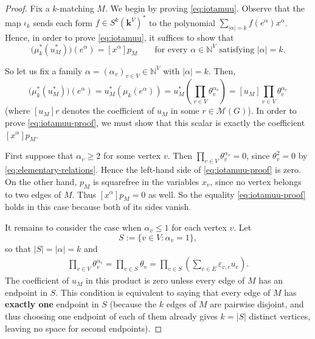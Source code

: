\documentclass[12pt]{amsart}
\theoremstyle{definition}
\theoremstyle{remark}
\newcommand{\kk}{\mathbf{k}}
\begin{document}
\begin{proof}
Fix a $k$-matching $M$.  We begin by proving \eqref{eq:iotamuu}.
Observe that the map $\iota_k$ sends each form $f \in S^k(\kk^V)^*$
to the polynomial $\sum_{|\alpha| = k} f(e^\alpha) x^\alpha$.
Hence, in order to prove \eqref{eq:iotamuu}, it suffices to show
that
\begin{equation}\label{eq:iotamuu-proof}
 \bigl(\mu_k^*(u_M^*)\bigr)(e^\alpha)=[x^\alpha]p_M
 \qquad\text{for every }\alpha \in \mathbb{N}^V
 \text{ satisfying }|\alpha| = k.
\end{equation}

So let us fix a family
$\alpha=(\alpha_v)_{v\in V}\in\mathbb{N}^V$ with
$|\alpha|=k$. Then,
\[
 \bigl(\mu_k^*(u_M^*)\bigr)(e^\alpha)
 = u_M^* \left( \mu_k(e^\alpha)\right)
 = u_M^* \left( \prod_{v\in V}\theta_v^{\alpha_v} \right)
 = [u_M]\prod_{v\in V}\theta_v^{\alpha_v}
\]
(where $[u_M] r$ denotes the coefficient of $u_M$ in some
$r \in \mathcal M(G)$).
In order to prove \eqref{eq:iotamuu-proof}, we must show
that this scalar is exactly the coefficient $[x^\alpha]p_M$.

First suppose that $\alpha_v\geq2$ for some vertex $v$.  Then
$\prod_{v\in V}\theta_v^{\alpha_v}=0$, since $\theta_v^2=0$ by
\eqref{eq:elementary-relations}.  Hence the left-hand side of
\eqref{eq:iotamuu-proof} is zero.  On the other hand, $p_M$ is squarefree
in the variables $x_v$, since no vertex belongs to two edges of $M$.
Thus $[x^\alpha]p_M=0$ as well.
So the equality \eqref{eq:iotamuu-proof} holds in this case because
both of its sides vanish.

It remains to consider the case when $\alpha_v\leq1$ for each vertex $v$.
Let
\[
 S:=\{v\in V:\alpha_v=1\},
\]
so that $|S|=|\alpha|=k$ and
\begin{align}
 \label{e-v-prod-1}
 \prod_{v\in V}\theta_v^{\alpha_v}
 =\prod_{v\in S}\theta_v
 =\prod_{v\in S}\left(\sum_{e\in E}\varepsilon_{v,e}u_e\right).
\end{align}
The coefficient of $u_M$ in this product is zero unless every edge of $M$
has an endpoint in $S$.  This condition is equivalent to saying that
every edge of $M$ has \textbf{exactly one} endpoint in $S$
(because the $k$ edges of $M$ are pairwise disjoint,
and thus choosing one endpoint of each of them already gives $k=|S|$
distinct vertices, leaving no space for second endpoints).


\end{proof}
\end{document}
